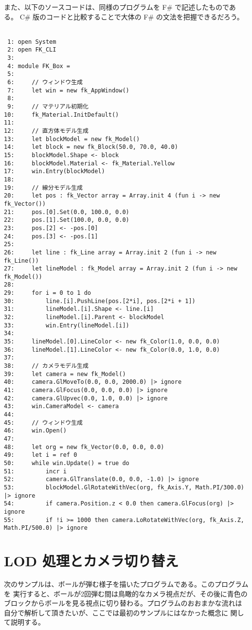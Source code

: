 また、以下のソースコードは、同様のプログラムを F\# で記述したものである。
C\# 版のコードと比較することで大体の F\# の文法を把握できるだろう。\\ ~

\begin{breakbox}
\begin{small}
\begin{verbatim}
 1: open System
 2: open FK_CLI
 3: 
 4: module FK_Box =
 5: 
 6:     // ウィンドウ生成
 7:     let win = new fk_AppWindow()
 8: 
 9:     // マテリアル初期化
10:     fk_Material.InitDefault()
11: 
12:     // 直方体モデル生成
13:     let blockModel = new fk_Model()
14:     let block = new fk_Block(50.0, 70.0, 40.0)
15:     blockModel.Shape <- block
16:     blockModel.Material <- fk_Material.Yellow
17:     win.Entry(blockModel)
18: 
19:     // 線分モデル生成
20:     let pos : fk_Vector array = Array.init 4 (fun i -> new fk_Vector())
21:     pos.[0].Set(0.0, 100.0, 0.0)
22:     pos.[1].Set(100.0, 0.0, 0.0)
23:     pos.[2] <- -pos.[0]
24:     pos.[3] <- -pos.[1]
25: 
26:     let line : fk_Line array = Array.init 2 (fun i -> new fk_Line())
27:     let lineModel : fk_Model array = Array.init 2 (fun i -> new fk_Model())
28: 
29:     for i = 0 to 1 do
30:         line.[i].PushLine(pos.[2*i], pos.[2*i + 1])
31:         lineModel.[i].Shape <- line.[i]
32:         lineModel.[i].Parent <- blockModel
33:         win.Entry(lineModel.[i])
34: 
35:     lineModel.[0].LineColor <- new fk_Color(1.0, 0.0, 0.0)
36:     lineModel.[1].LineColor <- new fk_Color(0.0, 1.0, 0.0)
37: 
38:     // カメラモデル生成
39:     let camera = new fk_Model()
40:     camera.GlMoveTo(0.0, 0.0, 2000.0) |> ignore
41:     camera.GlFocus(0.0, 0.0, 0.0) |> ignore
42:     camera.GlUpvec(0.0, 1.0, 0.0) |> ignore
43:     win.CameraModel <- camera
44: 
45:     // ウィンドウ生成
46:     win.Open()
47: 
48:     let org = new fk_Vector(0.0, 0.0, 0.0)
49:     let i = ref 0
50:     while win.Update() = true do
51:         incr i
52:         camera.GlTranslate(0.0, 0.0, -1.0) |> ignore
53:         blockModel.GlRotateWithVec(org, fk_Axis.Y, Math.PI/300.0) |> ignore
54:         if camera.Position.z < 0.0 then camera.GlFocus(org) |> ignore
55:         if !i >= 1000 then camera.LoRotateWithVec(org, fk_Axis.Z, Math.PI/500.0) |> ignore
\end{verbatim}
\end{small}
\end{breakbox}

\section{LOD 処理とカメラ切り替え}
次のサンプルは、ボールが弾む様子を描いたプログラムである。このプログラムを
実行すると、ボールが2回弾む間は鳥瞰的なカメラ視点だが、その後に青色の
ブロックからボールを見る視点に切り替わる。プログラムのおおまかな流れは
自分で解析して頂きたいが、ここでは最初のサンプルにはなかった概念に
関して説明する。

